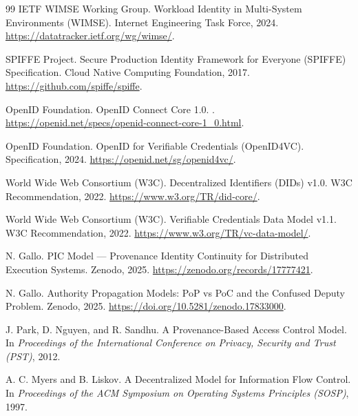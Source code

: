 \documentclass[11pt]{article}
\begin{document}
\begin{thebibliography}{99}
IETF WIMSE Working Group.
\newblock Workload Identity in Multi-System Environments (WIMSE).
\newblock Internet Engineering Task Force, 2024.
\url{https://datatracker.ietf.org/wg/wimse/}.

SPIFFE Project.
\newblock Secure Production Identity Framework for Everyone (SPIFFE)
Specification.
\newblock Cloud Native Computing Foundation, 2017.
\url{https://github.com/spiffe/spiffe}.

OpenID Foundation.
\newblock OpenID Connect Core 1.0.
. \url{https://openid.net/specs/openid-connect-core-1_0.html}.

OpenID Foundation.
\newblock OpenID for Verifiable Credentials (OpenID4VC).
\newblock Specification, 2024. \url{https://openid.net/sg/openid4vc/}.

World Wide Web Consortium (W3C).
\newblock Decentralized Identifiers (DIDs) v1.0.
\newblock W3C Recommendation, 2022. \url{https://www.w3.org/TR/did-core/}.

World Wide Web Consortium (W3C).
\newblock Verifiable Credentials Data Model v1.1.
\newblock W3C Recommendation, 2022. \url{https://www.w3.org/TR/vc-data-model/}.

N. Gallo.
\newblock PIC Model --- Provenance Identity Continuity for Distributed Execution
Systems.
\newblock Zenodo, 2025. \url{https://zenodo.org/records/17777421}.

N. Gallo.
\newblock Authority Propagation Models: PoP vs PoC and the Confused Deputy
Problem.
\newblock Zenodo, 2025. \url{https://doi.org/10.5281/zenodo.17833000}.

J. Park, D. Nguyen, and R. Sandhu.
\newblock A Provenance-Based Access Control Model.
\newblock In \emph{Proceedings of the International Conference on Privacy,
Security and Trust (PST)}, 2012.

A. C. Myers and B. Liskov.
\newblock A Decentralized Model for Information Flow Control.
\newblock In \emph{Proceedings of the ACM Symposium on Operating Systems
Principles (SOSP)}, 1997.

\end{thebibliography}
\end{document}
